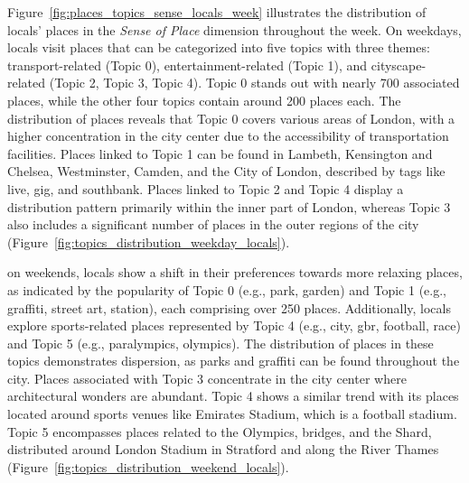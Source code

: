\documentclass{article}
\theoremstyle{definition}
\theoremstyle{remark}
\begin{document}
Figure~\ref{fig:places_topics_sense_locals_week} illustrates the distribution of locals' places in the \textit{Sense of Place} dimension throughout the week. On weekdays, locals visit places that can be categorized into five topics with three themes: transport-related (Topic 0), entertainment-related (Topic 1), and cityscape-related (Topic 2, Topic 3, Topic 4). Topic 0 stands out with nearly 700 associated places, while the other four topics contain around 200 places each. The distribution of places reveals that Topic 0 covers various areas of London, with a higher concentration in the city center due to the accessibility of transportation facilities. Places linked to Topic 1 can be found in Lambeth, Kensington and Chelsea, Westminster, Camden, and the City of London, described by tags like live, gig, and southbank. Places linked to Topic 2 and Topic 4 display a distribution pattern primarily within the inner part of London, whereas Topic 3 also includes a significant number of places in the outer regions of the city (Figure~\ref{fig:topics_distribution_weekday_locals}).

on weekends, locals show a shift in their preferences towards more relaxing places, as indicated by the popularity of Topic 0 (e.g., park, garden) and Topic 1 (e.g., graffiti, street art, station), each comprising over 250 places. Additionally, locals explore sports-related places represented by Topic 4 (e.g., city, gbr, football, race) and Topic 5 (e.g., paralympics, olympics). The distribution of places in these topics demonstrates dispersion, as parks and graffiti can be found throughout the city. Places associated with Topic 3 concentrate in the city center where architectural wonders are abundant. Topic 4 shows a similar trend with its places located around sports venues like Emirates Stadium, which is a football stadium. Topic 5 encompasses places related to the Olympics, bridges, and the Shard, distributed around London Stadium in Stratford and along the River Thames (Figure~\ref{fig:topics_distribution_weekend_locals}).
\end{document}
